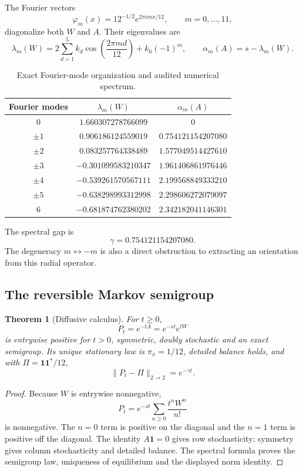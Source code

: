 \documentclass[11pt,a4paper]{article}
\newtheorem{theorem}{Theorem}[section]
\theoremstyle{definition}
\theoremstyle{remark}
\newcommand{\one}{\bm 1}
\begin{document}
The Fourier vectors
\[
 \varphi_m(x)=12^{-1/2}e^{2\pi imx/12},\qquad m=0,\ldots,11,
\]
diagonalize both $W$ and $A$. Their eigenvalues are
\[
 \lambda_m(W)=2\sum_{d=1}^{5}k_d\cos\!\left(\frac{2\pi md}{12}\right)+k_6(-1)^m,
 \qquad \alpha_m(A)=s-\lambda_m(W).
\]

\begin{table}[H]
\centering
\caption{Exact Fourier-mode organization and audited numerical spectrum.}
\begin{tabular}{@{}ccc@{}}
\toprule
Fourier modes & $\lambda_m(W)$ & $\alpha_m(A)$\\
\midrule
$0$ & $1.660307278766099$ & $0$\\
$\pm1$ & $0.906186124559019$ & $0.754121154207080$\\
$\pm2$ & $0.083257764338489$ & $1.577049514427610$\\
$\pm3$ & $-0.301099583210347$ & $1.961406861976446$\\
$\pm4$ & $-0.539261570567111$ & $2.199568849333210$\\
$\pm5$ & $-0.638298993312998$ & $2.298606272079097$\\
$6$ & $-0.681874762380202$ & $2.342182041146301$\\
\bottomrule
\end{tabular}
\end{table}

The spectral gap is
\[
 \gamma=0.754121154207080.
\]
The degeneracy $m\leftrightarrow -m$ is also a direct obstruction to extracting an orientation from this radial operator.

\subsection{The reversible Markov semigroup}

\begin{theorem}[Diffusive calculus]
For $t\ge0$,
\[
 P_t=e^{-tA}=e^{-st}e^{tW}
\]
is entrywise positive for $t>0$, symmetric, doubly stochastic and an exact semigroup. Its unique stationary law is $\pi_x=1/12$, detailed balance holds, and with $\Pi=\one\one^*/12$,
\[
 \|P_t-\Pi\|_{2\to2}=e^{-\gamma t}.
\]
\end{theorem}

\begin{proof}
Because $W$ is entrywise nonnegative,
\[
 P_t=e^{-st}\sum_{n\ge0}\frac{t^nW^n}{n!}
\]
is nonnegative. The $n=0$ term is positive on the diagonal and the $n=1$ term is positive off the diagonal. The identity $A\one=0$ gives row stochasticity; symmetry gives column stochasticity and detailed balance. The spectral formula proves the semigroup law, uniqueness of equilibrium and the displayed norm identity.
\end{proof}
\end{document}
